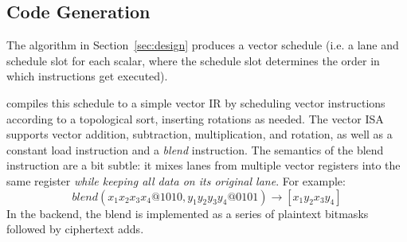 



\subsection{Code Generation}\label{sec:codegen}
The algorithm in Section~\ref{sec:design} produces a vector schedule (i.e. a lane and schedule slot for each scalar, where the schedule slot determines the order in which instructions get executed).

\system compiles this schedule to a simple vector IR by scheduling vector instructions according to a topological sort, inserting rotations as needed.
The vector ISA supports vector addition, subtraction, multiplication, and rotation, as well as a constant load instruction and a {\em blend} instruction.
The semantics of the blend instruction are a bit subtle: it mixes lanes from multiple vector registers into the same register {\em while keeping all data on its original lane}.
For example: $$blend(x_1x_2x_3x_4@1010, y_1y_2y_3y_4@0101) \to [x_1y_2x_3y_4]$$
In the backend, the blend is implemented as a series of plaintext bitmasks followed by ciphertext adds. 

